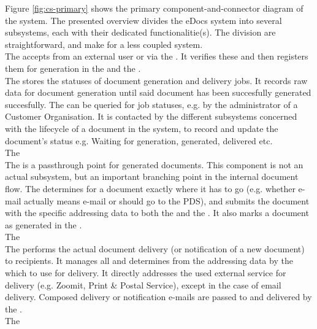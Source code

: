 Figure \ref{fig:cs-primary} shows the primary component-and-connector diagram of the system. The presented overview divides the eDocs system into several subsystems, each with their dedicated functionalitie(s). The division are straightforward, and make for a less coupled system.\\
The  accepts  from an external user or via the . It verifies these  and then registers them for generation in the  and the .\\
The  stores the statuses of document generation and delivery jobs. It records raw data for document generation until said document has been succesfully generated succesfully. The  can be queried for job statuses, e.g. by the administrator of a Customer Organisation. It is contacted by the different subsystems concerned with the lifecycle of a document in the system, to record and update the document's status e.g. Waiting for generation, generated, delivered etc.\\
The  \\
The  is a passthrough point for generated documents. This component is not an actual subsystem, but an important branching point in the internal document flow. The  determines for a document exactly where it has to go (e.g. whether e-mail actually means e-mail or should go to the PDS), and submits the document with the specific addressing data to both the  and the . It also marks a document as generated in the .\\
The  \\
The  performs the actual document delivery (or notification of a new document) to recipients. It manages all  and determines from the addressing data by the  which  to use for delivery. It directly addresses the used external service for delivery (e.g. Zoomit, Print \& Postal Service), except in the case of email delivery. Composed delivery or notification e-mails are passed to and delivered by the .\\
The  \\
